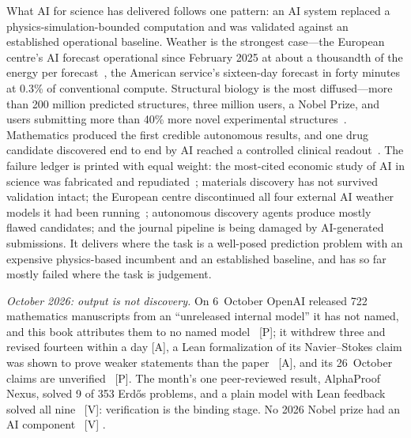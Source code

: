 What AI for science has delivered follows one pattern: an AI system replaced a physics-simulation-bounded computation and was validated against an established operational baseline. Weather is the strongest case---the European centre's AI forecast operational since February 2025 at about a thousandth of the energy per forecast~\cite{ecmwf-aifs}, the American service's sixteen-day forecast in forty minutes at 0.3\% of conventional compute. Structural biology is the most diffused---more than 200 million predicted structures, three million users, a Nobel Prize, and users submitting more than 40\% more novel experimental structures~\cite{alphafold-impact}. Mathematics produced the first credible autonomous results, and one drug candidate discovered end to end by AI reached a controlled clinical readout~\cite{rentosertib}. The failure ledger is printed with equal weight: the most-cited economic study of AI in science was fabricated and repudiated~\cite{mit-repudiation}; materials discovery has not survived validation intact; the European centre discontinued all four external AI weather models it had been running~\cite{ecmwf-farewell}; autonomous discovery agents produce mostly flawed candidates; and the journal pipeline is being damaged by AI-generated submissions. It delivers where the task is a well-posed prediction problem with an expensive physics-based incumbent and an established baseline, and has so far mostly failed where the task is judgement.

\emph{October 2026: output is not discovery.} On 6~October OpenAI released 722 mathematics manuscripts from an ``unreleased internal model'' it has not named, and this book attributes them to no named model~\cite{sci-rw-openai} [P]; it withdrew three and revised fourteen within a day [A], a Lean formalization of its Navier--Stokes claim was shown to prove weaker statements than the paper~\cite{sci-navier-lean} [A], and its 26~October claims are unverified~\cite{sci-openai-oct26} [P]. The month's one peer-reviewed result, AlphaProof Nexus, solved 9 of 353 Erd\H{o}s problems, and a plain model with Lean feedback solved all nine~\cite{sci-alphaproof-nexus} [V]: verification is the binding stage. No 2026 Nobel prize had an AI component~\cite{sci-nobel-2026} [V] .


